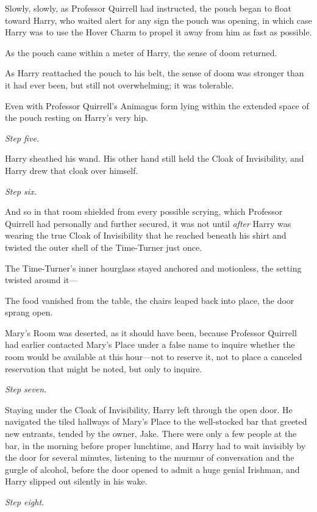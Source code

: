 Slowly, slowly, as Professor Quirrell had instructed, the pouch began to float 
toward Harry, who waited alert for any sign the pouch was opening, in which 
case Harry was to use the Hover Charm to propel it away from him as fast as 
possible.

As the pouch came within a meter of Harry, the sense of doom returned.

As Harry reattached the pouch to his belt, the sense of doom was stronger than 
it had ever been, but still not overwhelming; it was tolerable.

Even with Professor Quirrell's Animagus form lying within the extended space of 
the pouch resting on Harry's very hip.

\emph{Step five.}

Harry sheathed his wand. His other hand still held the Cloak of Invisibility, 
and Harry drew that cloak over himself.

\emph{Step six.}

And so in that room shielded from every possible scrying, which Professor 
Quirrell had personally and further secured, it was not until \emph{after} 
Harry was wearing the true Cloak of Invisibility that he reached beneath his 
shirt and twisted the outer shell of the Time-Turner just once.

The Time-Turner's inner hourglass stayed anchored and motionless, the setting 
twisted around it---

The food vanished from the table, the chairs leaped back into place, the door 
sprang open.

Mary's Room was deserted, as it should have been, because Professor Quirrell 
had earlier contacted Mary's Place under a false name to inquire whether the 
room would be available at this hour---not to reserve it, not to place a 
canceled reservation that might be noted, but only to inquire.

\emph{Step seven.}

Staying under the Cloak of Invisibility, Harry left through the open door. He 
navigated the tiled hallways of Mary's Place to the well-stocked bar that 
greeted new entrants, tended by the owner, Jake. There were only a few people 
at the bar, in the morning before proper lunchtime, and Harry had to wait 
invisibly by the door for several minutes, listening to the murmur of 
conversation and the gurgle of alcohol, before the door opened to admit a huge 
genial Irishman, and Harry slipped out silently in his wake.

\emph{Step eight.}

